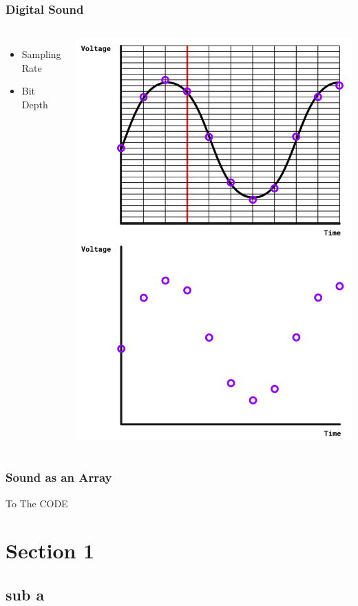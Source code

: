 \documentclass{beamer}
\begin{document}
\begin{frame}
    \frametitle{Digital Sound}
    \begin{columns}
        \begin{columns}
           \begin{itemize}
               \item Sampling Rate
               \item Bit Depth
           \end{itemize}
            \includegraphics[scale=.1]{voltageGraph.png}
            \end{columns}
    \end{columns}
    
\end{frame}
\begin{frame}
    \frametitle{Sound as an Array}
    To The CODE
\end{frame}
\section{Section 1}
\subsection{sub a}
 
\end{document}
